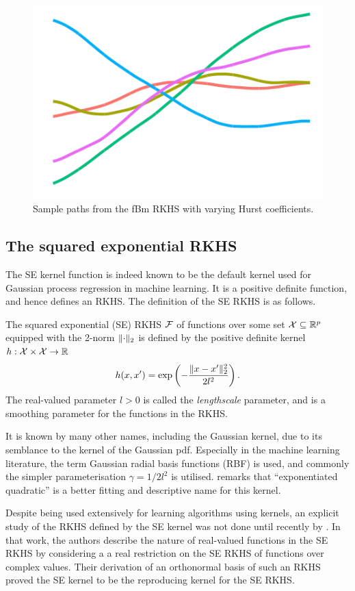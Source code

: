 \begin{figure}[hbt]
  \includegraphics[scale=0.4]{figure/kernel_path_fbm_07_th}
  \caption{Sample paths from the fBm RKHS with varying Hurst coefficients.}
\end{figure}

\subsection{The squared exponential RKHS}

The \gls{SE} kernel function is indeed known to be the default kernel used for Gaussian process regression in machine learning.
It is a positive definite function, and hence defines an RKHS.
The definition of the \gls{SE} RKHS is as follows.

\begin{definition}
  The squared exponential (SE) RKHS ${\mathcal F}$ of functions over some set ${\mathcal X} \subseteq \mathbb{R}^p$ equipped with the 2-norm $\lVert\cdot\rVert_2$ is defined by the positive definite kernel $h:{\mathcal X}\times{\mathcal X}\to\mathbb{R}$ 
  \[
    h(x,x') = \exp\left( -\frac{\lVert x-x'\rVert_2^2}{2l^2} \right).
  \]
  The real-valued parameter $l > 0$ is called the \emph{lengthscale} parameter, and is a smoothing parameter for the functions in the RKHS.
\end{definition}

It is known by many other names, including the Gaussian kernel, due to its semblance to the kernel of the Gaussian pdf. 
Especially in the machine learning literature, the term Gaussian radial basis functions (RBF) is used, and commonly the simpler parameterisation $\gamma = 1 / 2l^2$ is utilised.
\citet{duvenaud2014automatic} remarks that ``exponentiated quadratic'' is a better fitting and descriptive name for this kernel.

Despite being used extensively for learning algorithms using kernels, an explicit study of the RKHS defined by the SE kernel was not done until recently by \citet{steinwart2006explicit}.
In that work, the authors describe the nature of real-valued functions in the SE RKHS by considering a a real restriction on the SE RKHS of functions over complex values.
Their derivation of an orthonormal basis of such an RKHS proved the SE kernel to be the reproducing kernel for the SE RKHS.

